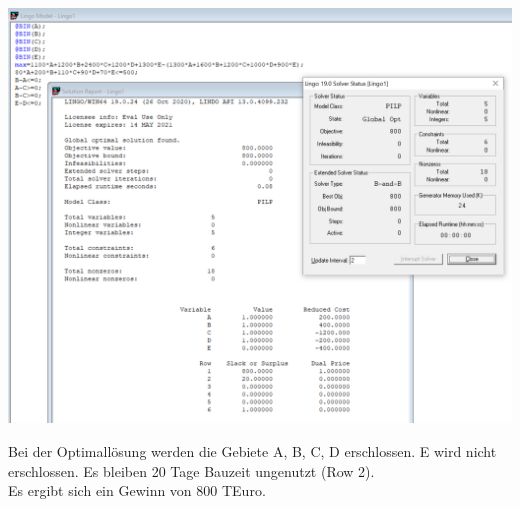 \documentclass[a4paper,11pt]{article}
\begin{document}
\begin{centering}
	\includegraphics[width=1\linewidth]{src/blatt_6_aufgabe_3_solverloesung.png}
\end{centering}

\vspace{6mm}

Bei der Optimallösung werden die Gebiete A, B, C, D erschlossen. E wird nicht erschlossen. Es bleiben 20 Tage Bauzeit ungenutzt (Row 2).\\
Es ergibt sich ein Gewinn von 800 TEuro.
\end{document}

